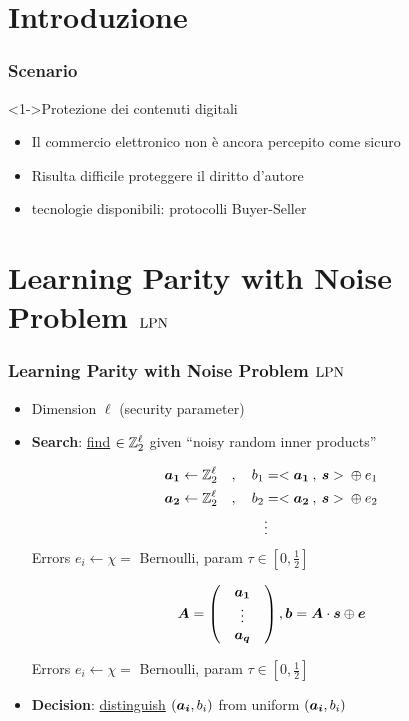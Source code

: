 \section{Introduzione}
\begin{frame}
 \frametitle{Scenario}
   \begin{block}<1->{Protezione dei contenuti digitali}
    \begin{itemize}
     \item Il commercio elettronico non è ancora percepito come sicuro
     \item Risulta difficile proteggere il diritto d'autore
     \item tecnologie disponibili: protocolli Buyer-Seller
    \end{itemize}
   \end{block}
\end{frame}

\section{Learning Parity with Noise Problem $\mathrm{LPN}$}

\begin{frame}
\frametitle{Learning Parity with Noise Problem $\mathrm{LPN}$}
\begin{itemize}
 \item Dimension $\ell$ (security parameter)
 \item \textbf{Search}: \underline{find}  $\in \mathbb{Z}_2^{\ell}$ given ``noisy random inner products'' \\
 \begin{overprint}
 \begin{align*}
  \boldsymbol{a_1} \gets \mathbb{Z}_2^{\ell} \quad , \quad b_1 &= <\boldsymbol{a_1} \: , \: \boldsymbol{s}> \: \mathbin{\oplus} \: e_1 \\
  \boldsymbol{a_2} \gets \mathbb{Z}_2^{\ell} \quad, \quad  b_2 &= <\boldsymbol{a_2} \: , \: \boldsymbol{s}> \: \mathbin{\oplus} \: e_2 \\
   & \vdots \\
  \end{align*}
  Errors $e_i \gets \chi =$ Bernoulli, param $\tau \in \left[ 0,\frac{1}{2} \right] $ 

\begin{equation*}
\vect{A} = \begin{pmatrix}
            & \vect{a_1} & \\
            & \vdots  &\\ 
            & \vect{a_q} & 
           \end{pmatrix} , \vect{b} = \vect{A} \cdot \vect{s} \xor \vect{e} \\
 
 
\end{equation*}

 \end{overprint}

Errors $e_i \gets \chi =$ Bernoulli, param $\tau \in \left[ 0,\frac{1}{2} \right] $ 
 \item \textbf{Decision}: \underline{distinguish} $\left( \boldsymbol{a_i}, b_i \right)$ from uniform $\left( \boldsymbol{a_i}, b_i \right)$
 \end{itemize}

\end{frame}


